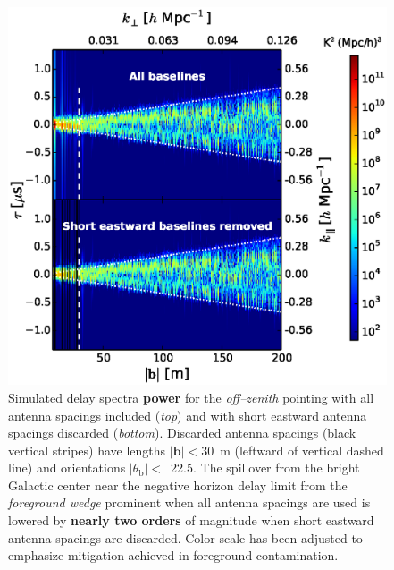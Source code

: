 \documentclass[preprint2,iop,numberedappendix]{emulateapj}
\begin{document}
\begin{figure}[htb]
\centering
\includegraphics[width=\linewidth]{fig13.eps}
\caption{Simulated delay spectra {\bf power} for the {\it off--zenith} pointing with all antenna spacings included ({\it top}) and with short eastward antenna spacings discarded ({\it bottom}). Discarded antenna spacings (black vertical stripes) have lengths $|\boldsymbol{b}|<30$~m (leftward of vertical dashed line) and orientations $|\theta_\textrm{b}|<$~22.5\arcdeg. The spillover from the bright Galactic center near the negative horizon delay limit from the {\it foreground wedge} prominent when all antenna spacings are used is lowered by {\bf nearly two orders} of magnitude when short eastward antenna spacings are discarded. Color scale has been adjusted to emphasize mitigation achieved in foreground contamination. \label{fig:before-after}}
\end{figure}
\end{document}

